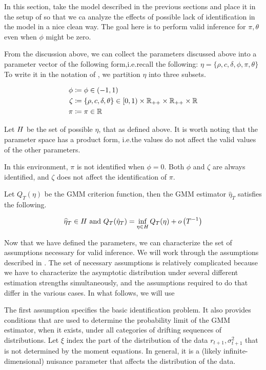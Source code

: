 \documentclass[11pt, letterpaper, twoside, final]{article}
\begin{document}
In this section, take the model described in the previous sections and place it in the setup of
\textcite{andrews2014Gmm} so that we ca analyze the effects of possible lack of identification in the model in a
nice clean way.
The goal here is to perform valid inference for $\pi, \theta$ even when $\phi$ might be zero. 


From the discussion above, we can collect the parameters discussed above into a parameter vector of the following
form,i.e.\@ recall the following: $\eta = \lbrace \rho, c, \delta, \phi, \pi, \theta \rbrace$
To write it in the notation of \textcite{andrews2014Gmm}, we partition $\eta$ into three subsets.

\begin{align}
    \phi &\coloneqq \phi  \in (-1, 1) \\ 
    \zeta &\coloneqq \lbrace \rho, c, \delta, \theta \rbrace \in [0,1) \times \mathbb{R}_{++} \times \mathbb{R}_{++} \times
    \mathbb{R}  \\
    \pi &\coloneqq \pi \in \mathbb{R} 
\end{align}

Let $H$ be the set of possible $\eta$, that as defined above.
It is worth noting that the parameter space has a product form, i.e.\@ the values do not affect the valid values
of the other parameters.

In this environment, $\pi$ is not identified when $\phi = 0$.
Both $\phi$ and $\zeta$ are always identified, and $\zeta$ does not affect the identification of $\pi$.

Let $Q_T(\eta)$ be the GMM criterion function, then the GMM estimator $\hat{\eta}_T$ satisfies the following.


\begin{equation}
    \widehat{\eta}_T \in \Eta\ \text{and}\ Q_T(\hat{\eta}_T) = \inf_{\eta \in \Eta} Q_T(\eta) +
    o\left(T^{-1}\right) 
\end{equation}


Now that we have defined the parameters, we can characterize the set of assumptions necessary for valid inference.
We will work through the assumptions described in \textcite{andrews2014Gmm}.
The set of necessary assumptions is relatively complicated because we have to characterize the asymptotic
distribution under several different estimation strengths simultaneously, and the assumptions required to do that
  differ in the various cases. 
In what follows, we will use 

The first assumption specifies the basic identification
problem. It also provides conditions that are used to determine the
probability limit of the GMM estimator, when it exists, under all categories
of drifting sequences of distributions.
Let $\xi$ index the part of the distribution of the data $r_{t+1}, \sigma^2_{t+1}$ that is not determined by the
moment equations.
In general, it is a (likely infinite-dimensional) nuisance parameter that affects the distribution of the data. 
\end{document}
